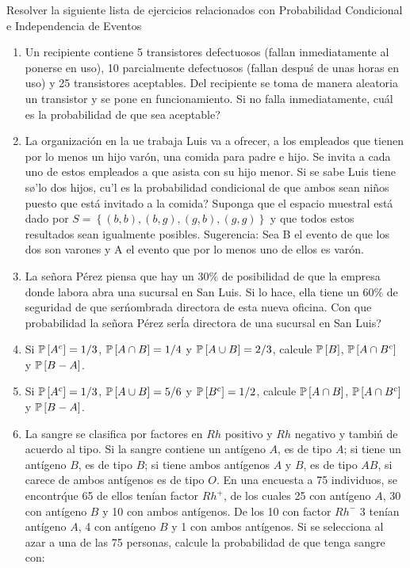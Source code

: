 \begin{Ejer} Resolver la siguiente lista de ejercicios relacionados con Probabilidad Condicional e Independencia de Eventos
\begin{enumerate}


\item Un recipiente contiene 5 transistores defectuosos (fallan inmediatamente al ponerse en uso), 10 parcialmente defectuosos (fallan despu\'s de unas horas en uso) y 25 transistores aceptables. Del recipiente se toma de manera aleatoria un transistor y se pone en funcionamiento. Si no falla inmediatamente,  cu\'al es la probabilidad de que sea aceptable?


\item La organizaci\'on en la ue trabaja Luis va a ofrecer, a los empleados que tienen por lo menos un hijo var\'on, una comida para padre e hijo. Se invita a cada uno de estos empleados a que asista con su hijo menor. Si se sabe Luis tiene s\o'lo dos hijos,  cu\a'l es la probabilidad condicional de que ambos sean ni\~nos puesto que est\'a invitado a la comida? Suponga que el espacio muestral est\'a dado por $S=\left\{\left(b,b\right),\left(b,g\right),\left(g,b\right),\left(g,g\right)\right\}$ y que todos estos resultados sean igualmente posibles. Sugerencia: Sea B el evento de que los dos son varones y A el evento que por lo menos uno de ellos es var\'on.

\item La se\~nora P\'erez piensa que hay un $30\%$ de posibilidad de que la empresa donde labora abra una sucursal en San Luis. Si lo hace, ella tiene un $60\%$ de seguridad de que ser\' nombrada directora de esta nueva oficina.  Con que probabilidad la se\~nora P\'erez ser\' la directora de una sucursal en San Luis?



\item Si $\mathbb{P}\left[A^{c}\right]=1/3$, $\mathbb{P}\left[A\cap B\right]=1/4$ y $\mathbb{P}\left[A\cup B\right]=2/3$, calcule $\mathbb{P}\left[B\right]$, $\mathbb{P}\left[A\cap B^{c}\right]$ y $\mathbb{P}\left[B-A\right]$.

\item Si $\mathbb{P}\left[A^{c}\right]=1/3$, $\mathbb{P}\left[A\cup B\right]=5/6$ y $\mathbb{P}\left[B^{c}\right]=1/2$, calcule $\mathbb{P}\left[A\cap B\right]$, $\mathbb{P}\left[A\cap B^{c}\right]$ y $\mathbb{P}\left[B-A\right]$.

\item La sangre se clasifica por factores en $Rh$ positivo y $Rh$ negativo y tambi\'n de acuerdo al tipo. Si la sangre contiene un ant\'igeno $A$, es de tipo $A$; si tiene un ant\'igeno $B$, es de tipo $B$; si tiene ambos ant\'igenos $A$ y $B$, es de tipo $AB$, si carece de ambos ant\'igenos es de tipo $O$. En una encuesta a 75 individuos, se encontr\' que 65 de ellos ten\'ian factor $Rh^{+}$, de los cuales 25 con ant\'igeno $A$, 30 con ant\'igeno $B$ y 10 con ambos ant\'igenos. De los 10 con factor $Rh^{-}$ 3 ten\'ian ant\'igeno $A$, 4 con ant\'igeno $B$ y 1 con ambos ant\'igenos. Si se selecciona al azar a una de las 75 personas, calcule la probabilidad de que tenga sangre con:


\end{enumerate}
\end{Ejer}
